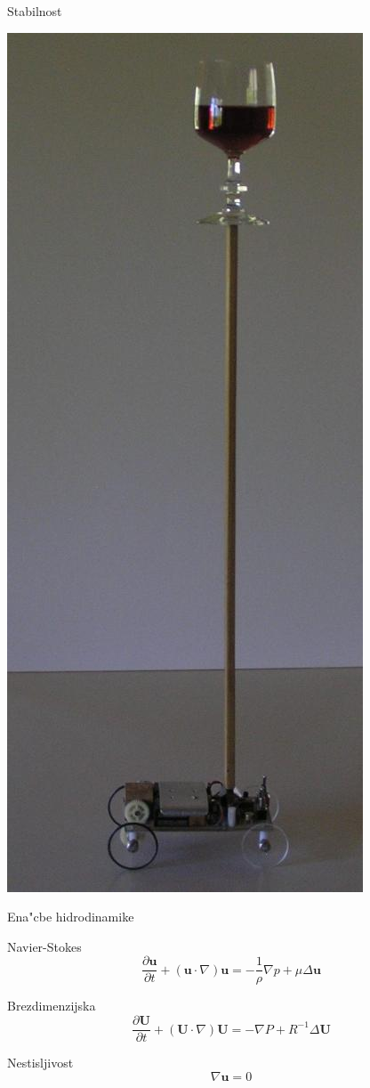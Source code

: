 \documentclass{beamer}
\renewcommand{\vec}{\mathbf}
\begin{document}
\begin{frame}{Stabilnost}
\begin{center}
\includegraphics[height=0.8\textheight]{./Slike/Balancer_with_wine}
\end{center}
\end{frame}

\begin{frame}{Ena"cbe hidrodinamike}

\begin{block}{Navier-Stokes}
\[ \frac{\partial \vec u}{\partial t} + (\vec u \cdot \nabla) \vec u = -\frac{1}{\rho}\nabla p + \mu \Delta \vec u \] 
\end{block}
\begin{block}{Brezdimenzijska}
\[ \frac{\partial \vec U}{\partial t} + (\vec U \cdot \nabla) \vec U = -\nabla P + R^{-1}\Delta \vec U \] 
\end{block}
\begin{block}{Nestisljivost}
\[ \nabla \vec u = 0 \]
\end{block}

\end{frame}
\end{document}
